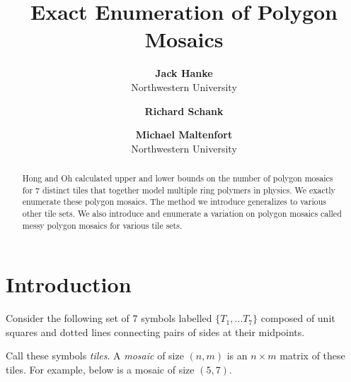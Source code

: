 \documentclass[12pt]{article}
\date{}
\author{
    \textbf{Jack Hanke}\\
    Northwestern University
    \and
    \textbf{Richard Schank}\\
    \and
    \textbf{Michael Maltenfort}\\
    Northwestern University
    }
\title{\textbf{Exact Enumeration of Polygon Mosaics}}
\theoremstyle{plain}
\theoremstyle{definition}
\theoremstyle{remark}
\theoremstyle{definition}
\newcommand{\cell}[4]{ \draw[thick] ( #1 , #2 ) rectangle ( #3 , #4 );}
\newcommand{\cellA}[4]{ \draw[thick] ( #1 , #2 ) rectangle ( #3 , #4 ); \draw[red, thick, densely dotted] (#3 * 0.5 + #1 * 0.5 , #2) -- (#3, #4 * 0.5 + #2 * 0.5);}
\newcommand{\cellB}[4]{ \draw[thick] ( #1 , #2 ) rectangle ( #3 , #4 ); \draw[red, thick, densely dotted] (#3 * 0.5 + #1 * 0.5 , #2) -- (#1, #4 * 0.5 + #2 * 0.5);}
\newcommand{\cellC}[4]{ \draw[thick] ( #1 , #2 ) rectangle ( #3 , #4 ); \draw[red, thick, densely dotted] (#3 * 0.5 + #1 * 0.5 , #4) -- (#1, #4 * 0.5 + #2 * 0.5);}
\newcommand{\cellD}[4]{ \draw[thick] ( #1 , #2 ) rectangle ( #3 , #4 ); \draw[red, thick, densely dotted] (#3 * 0.5 + #1 * 0.5 , #4) -- (#3, #4 * 0.5 + #2 * 0.5);}
\newcommand{\cellE}[4]{ \draw[thick] ( #1 , #2 ) rectangle ( #3 , #4 ); \draw[red, thick, densely dotted] (#3 * 0.5 + #1 * 0.5 , #2) -- (#3 * 0.5 + #1 * 0.5 , #4);}
\newcommand{\cellF}[4]{ \draw[thick] ( #1 , #2 ) rectangle ( #3 , #4 ); \draw[red, thick, densely dotted] (#3, #4 * 0.5 + #2 * 0.5) -- (#1, #4 * 0.5 + #2 * 0.5);}
\newcommand{\lablnode}[3]{\node[shape=circle,draw=none,fill=none, inner sep=0pt,minimum size=0pt] (A) at ( #1 , #2 ) {#3};}
\begin{document}
\maketitle

\begin{center}

    \begin{abstract}
        Hong and Oh calculated upper and lower bounds on the number of polygon mosaics for $7$ distinct tiles that together model multiple ring polymers in physics. We exactly enumerate these polygon mosaics. The method we introduce generalizes to various other tile sets. We also introduce and enumerate a variation on polygon mosaics called messy polygon mosaics for various tile sets.
    \end{abstract}

\end{center}

\section{Introduction}

Consider the following set of $7$ symbols labelled $\{ T_1, \dots T_7 \}$ composed of unit squares and dotted lines connecting pairs of sides at their midpoints.

\begin{center}
\end{center}

Call these symbols \textit{tiles}. A \textit{mosaic} of size $(n, m)$ is an $n \times m$ matrix of these tiles. For example, below is a mosaic of size $(5,7)$.
\end{document}
